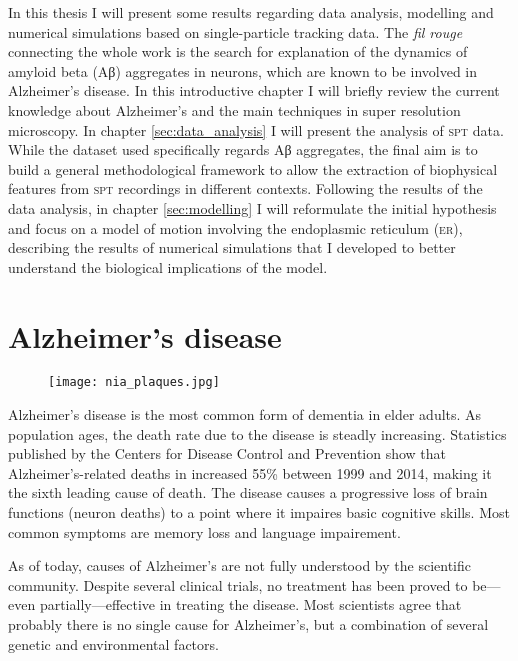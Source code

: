 In this thesis I will present some results regarding data analysis, modelling and numerical simulations based on single-particle tracking data. The \textit{fil rouge} connecting the whole work is the search for explanation of the dynamics of amyloid beta (Aβ) aggregates in neurons, which are known to be involved in Alzheimer's disease. In this introductive chapter I will briefly review the current knowledge about Alzheimer's and the main techniques in super resolution microscopy. In chapter \ref{sec:data_analysis} I will present the analysis of \textsc{spt} data. While the dataset used specifically regards Aβ aggregates, the final aim is to build a general methodological framework to allow the extraction of biophysical features from \textsc{spt} recordings in different contexts. Following the results of the data analysis, in chapter \ref{sec:modelling} I will reformulate the initial hypothesis and focus on a model of motion involving the endoplasmic reticulum (\textsc{er}), describing the results of numerical simulations that I developed to better understand the biological implications of the model.


\section{Alzheimer's disease}\label{sec:alzheimer}

\begin{figure}[b!]
  \texttt{[image: nia\_plaques.jpg]}
\end{figure}

Alzheimer’s disease is the most common form of dementia in elder adults. As population ages, the death rate due to the disease is steadly increasing. Statistics published by the Centers for Disease Control and Prevention show that Alzheimer’s-related deaths in  increased 55\% between 1999 and 2014, making it the sixth leading cause of death. The disease causes a progressive loss of brain functions (neuron deaths) to a point where it impaires basic cognitive skills. Most common symptoms are memory loss and language impairement.

As of today, causes of Alzheimer’s are not fully understood by the scientific community. Despite several clinical trials, no treatment has been proved to be---even partially---effective in treating the disease. Most scientists agree that probably there is no single cause for Alzheimer’s, but a combination of several genetic and environmental factors.

